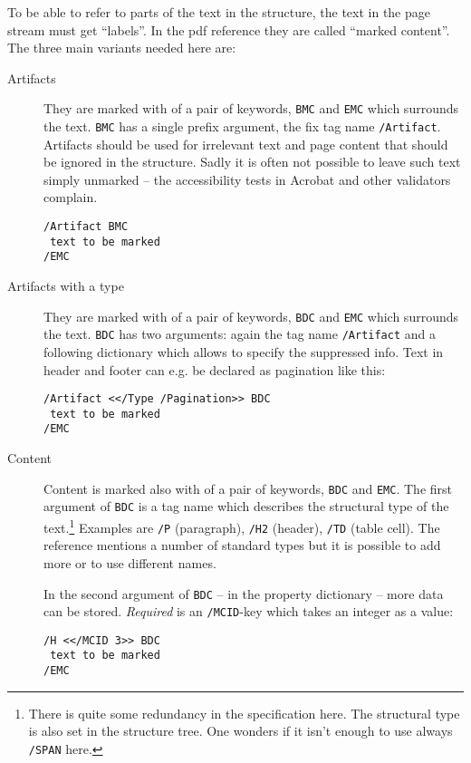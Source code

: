 \documentclass[DIV=12,parskip=half-,bibliography=totoc]{scrartcl}
\begin{document}
To be able to refer to parts of the text in the structure, the text in the page stream must get \enquote{labels}. In the pdf reference they are called \enquote{marked content}. The three main variants needed here are:

\begin{description}
\item[Artifacts] They are marked with of a pair of keywords, \texttt{BMC} and \texttt{EMC} which surrounds the text. \texttt{BMC} has a single prefix argument, the fix tag name \texttt{/Artifact}. Artifacts should be used for irrelevant text and page content that should be ignored in the structure. Sadly it is often not possible to leave such text simply unmarked -- the accessibility tests in Acrobat and other validators complain.

\begin{lstlisting}
/Artifact BMC
 text to be marked
/EMC
\end{lstlisting}

\item[Artifacts with a type]  They are marked with of a pair of keywords, \texttt{BDC} and \texttt{EMC} which surrounds the text. \texttt{BDC} has two arguments: again the tag name \texttt{/Artifact} and a following dictionary which allows to specify the suppressed info. Text in header and footer can e.g. be declared as pagination like this:

\begin{lstlisting}
/Artifact <</Type /Pagination>> BDC
 text to be marked
/EMC
\end{lstlisting}

\item[Content]  Content is marked also with of a pair of keywords, \texttt{BDC} and \texttt{EMC}. The first argument of \texttt{BDC} is a tag name which describes the structural type of the text.\footnote{There is quite some redundancy in the specification here. The structural type is also set in the structure tree. One wonders if it isn't enough to use  always \texttt{/SPAN} here.}   Examples are \texttt{/P} (paragraph), \texttt{/H2} (header), \texttt{/TD} (table cell). The reference mentions a number of standard types but it is possible to add more or to use different names.


    In the second argument of \texttt{BDC} -- in the property dictionary -- more data can be stored. \emph{Required} is an \texttt{/MCID}-key which takes an integer as a value:

\begin{lstlisting}
/H <</MCID 3>> BDC
 text to be marked
/EMC
\end{lstlisting}


\end{description}
\end{document}
